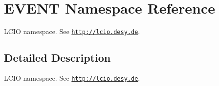 \hypertarget{namespace_e_v_e_n_t}{}\section{E\+V\+E\+NT Namespace Reference}
\label{namespace_e_v_e_n_t}


L\+C\+IO namespace. See \href{http://lcio.desy.de}{\tt http\+://lcio.\+desy.\+de}.  




\subsection{Detailed Description}
L\+C\+IO namespace. See \href{http://lcio.desy.de}{\tt http\+://lcio.\+desy.\+de}. 